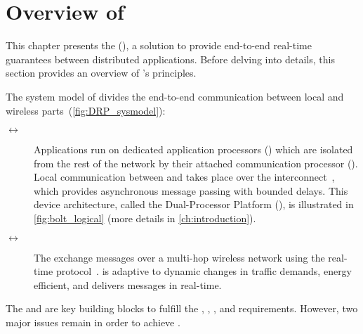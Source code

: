 
\section{Overview of \DRP}
\label{sec:design_overview}


This chapter presents the \DRPLong (\DRP), a solution to provide end-to-end real-time guarantees between distributed applications.
Before delving into details, this section provides an overview of \DRP's principles.

The system model of \DRP divides the end-to-end communication between local and wireless parts~(\cref{fig:DRP_sysmodel}):
\pagebreak
\begin{description}
  \item[\AP  $\boldsymbol{\leftrightarrow}$ \CP]
  Applications run on dedicated application processors (\APs) which are isolated from the rest of the network by their attached communication processor (\CP).
  Local communication between \APs and \CPs  takes place over the \bolt interconnect~\cite{sutton2015Bolt}, which provides asynchronous message passing with bounded delays.
  This device architecture, called the Dual-Processor Platform (\DPP), is illustrated in \cref{fig:bolt_logical} (more details in \cref{ch:introduction}).

  \item[\CP  $\boldsymbol{\leftrightarrow}$ \CP]
  The \CPs exchange messages over a multi-hop wireless network using the \blink real-time protocol~\cite{zimmerling2017Blink}.
  \blink is adaptive to dynamic changes in traffic demands, energy efficient, and delivers messages in real-time.
\end{description}

The \DPP and \blink are key building blocks to fulfill the , , , and  requirements.
However, two major issues remain in order to achieve .

